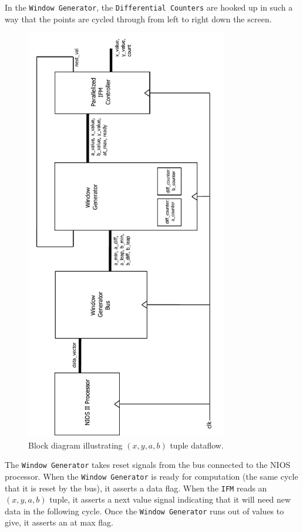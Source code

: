\documentclass{article}
\begin{document}
In the \texttt{Window Generator}, the \texttt{Differential Counters} are hooked up in such a way that the points are cycled through
from left to right down the screen.

\begin{figure}
  \centering
    \includegraphics[width=250pt, angle=270]{block_diagrams/win_gen_interior.pdf}
  \caption{Block diagram illustrating $(x, y, a, b)$ tuple dataflow.}
\end{figure}

The \texttt{Window Generator} takes reset signals from the bus connected to the NIOS processor. When the \texttt{Window
Generator} is ready for computation (the same cycle that it is reset by the bus), it asserts a data flag.
When the \texttt{IFM} reads an $(x, y, a, b)$ tuple, it asserts a next value signal indicating that it will need new data in the following cycle. Once the \texttt{Window Generator} runs out of values to give, it asserts an at max flag.
\end{document}
